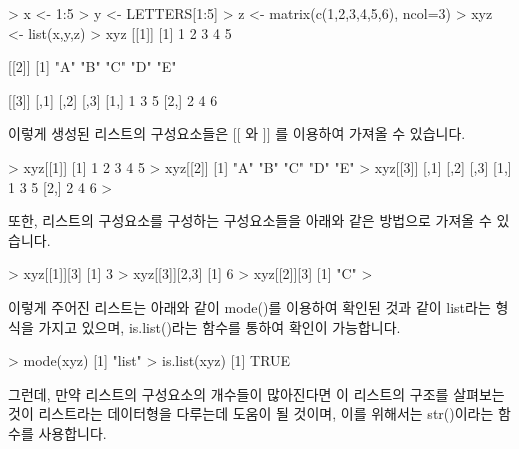 \documentclass{book}
\begin{document}
\begin{Schunk}
\begin{Soutput}
> x <- 1:5
> y <- LETTERS[1:5]
> z <- matrix(c(1,2,3,4,5,6), ncol=3)
> xyz <- list(x,y,z)
> xyz
[[1]]
[1] 1 2 3 4 5

[[2]]
[1] "A" "B" "C" "D" "E"

[[3]]
     [,1] [,2] [,3]
[1,]    1    3    5
[2,]    2    4    6
 
\end{Soutput}
\end{Schunk}

이렇게 생성된 리스트의 구성요소들은 $[[$ 와 $]]$ 를 이용하여 가져올 수 있습니다.

\begin{Schunk}
\begin{Soutput}
> xyz[[1]]
[1] 1 2 3 4 5
> xyz[[2]]
[1] "A" "B" "C" "D" "E"
> xyz[[3]]
     [,1] [,2] [,3]
[1,]    1    3    5
[2,]    2    4    6
> 
\end{Soutput}
\end{Schunk}

또한, 리스트의 구성요소를 구성하는 구성요소들을 아래와 같은 방법으로 가져올 수 있습니다.
\begin{Schunk}
\begin{Soutput}
> xyz[[1]][3]
[1] 3
> xyz[[3]][2,3]
[1] 6
> xyz[[2]][3]
[1] "C"
> 
\end{Soutput}
\end{Schunk}

이렇게 주어진 리스트는 아래와 같이 mode()를 이용하여 확인된 것과 같이 list라는 형식을 가지고 있으며, is.list()라는 함수를 통하여 확인이 가능합니다.

\begin{Schunk}
\begin{Soutput}
> mode(xyz)
[1] "list"
> is.list(xyz)
[1] TRUE
\end{Soutput}
\end{Schunk}

그런데, 만약 리스트의 구성요소의 개수들이 많아진다면 이 리스트의 구조를 살펴보는 것이 리스트라는 데이터형을 다루는데 도움이 될 것이며, 이를 위해서는 str()이라는 함수를 사용합니다.

\begin{Schunk}
\end{Schunk}
\end{document}

